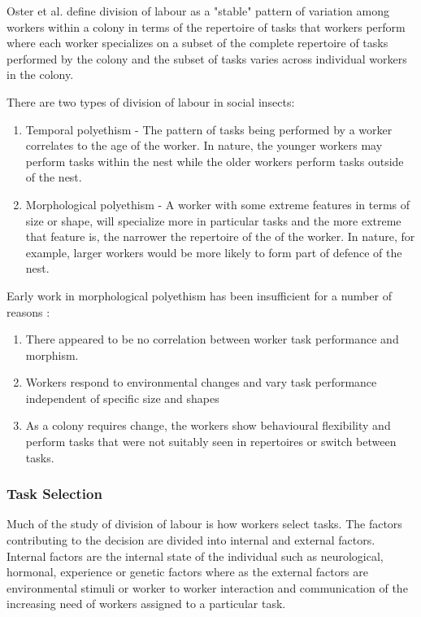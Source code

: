 Oster et al. define division of labour as a "stable" pattern of variation among workers within a colony in terms of the repertoire of tasks that workers perform where each worker specializes on a subset of the complete repertoire of tasks performed by the colony and the subset of tasks varies across individual workers in the colony.  \cite{oster1978caste}  %

There are two types of division of labour in social insects: 
\begin{enumerate}
	\item Temporal polyethism - The pattern of tasks being performed by a worker correlates to the age of the worker. In nature, the younger workers may perform tasks within the nest while the older workers perform tasks outside of the nest.
	\item Morphological polyethism - A worker with some extreme features in terms of size or shape, will specialize more in particular tasks and the more extreme that feature is, the narrower the repertoire of the of the worker. In nature, for example, larger workers would be more likely to form part of defence of the nest. \cite{beshers2001models}
\end{enumerate}

Early work in morphological polyethism has been insufficient for a number of reasons \cite{huang1996regulation}: 

\begin{enumerate}
	\item There appeared to be no correlation between worker task performance and morphism.
	\item Workers respond to environmental changes and vary task performance independent of specific size and shapes
	\item As a colony requires change, the workers show behavioural flexibility and perform tasks that were not suitably seen in repertoires or switch between tasks.
\end{enumerate}

\subsubsection{Task Selection}
Much of the study of division of labour is how workers select tasks. The factors contributing to the decision are divided into internal and external factors. Internal factors are the internal state of the individual such as neurological, hormonal, experience or genetic factors where as the external factors are environmental stimuli or worker to worker interaction and communication of the increasing need of workers assigned to a particular task. \cite{beshers2001models}

